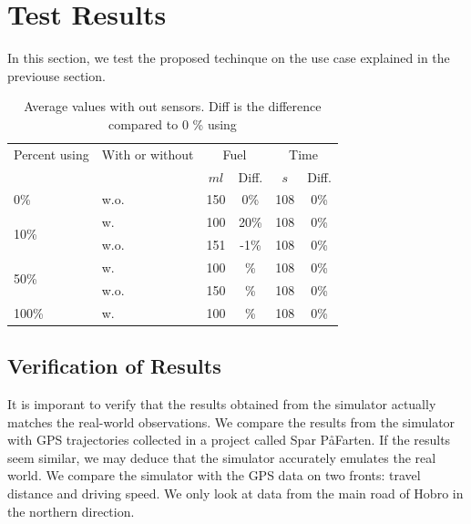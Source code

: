 \section{Test Results}\label{sec:Test}
In this section, we test the proposed techinque on the use case explained in the previouse section.


\begin{table}
\centering
\begin{tabular}{|l|l|cc|cc|}\hline
Percent using 			& With or without				& \multicolumn{2}{c|}{Fuel} 	& \multicolumn{2}{c|}{Time}\\
\tech					&\tech					& $ml$	& Diff.		&	$s$	& Diff.\\\hline
\multirow{1}{*}{0\%}	& w.o. \tech	&	150 &	0\%	&	108 & 0\%		\\\hline
\multirow{2}{*}{10\%}	& w. \tech		&	100 &	20\%	&	108 & 0\%		\\
						& w.o. \tech	&	151 &	-1\%	&	108 & 0\%		\\\hline
\multirow{2}{*}{50\%}	& w. \tech		&	100	&	\%		&	108 & 0\%\\
						& w.o. \tech	&	150	&	\%		&	108 & 0\%\\\hline
\multirow{1}{*}{100\%}	& w. \tech		&	100	&	\%		&	108 & 0\%\\\hline
\end{tabular}
\caption{Average values with out sensors. Diff is the difference compared to 0 \% using \tech}
\label{tb:TestResults:total}
\end{table}

\subsection{Verification of Results}
It is imporant to verify that the results obtained from the simulator actually matches the real-world observations.
We compare the results from the simulator with GPS trajectories collected in a project called Spar P\aa Farten\cite{}.
If the results seem similar, we may deduce that the simulator accurately emulates the real world.
We compare the simulator with the GPS data on two fronts: travel distance and driving speed.
We only look at data from the main road of Hobro in the northern direction.

